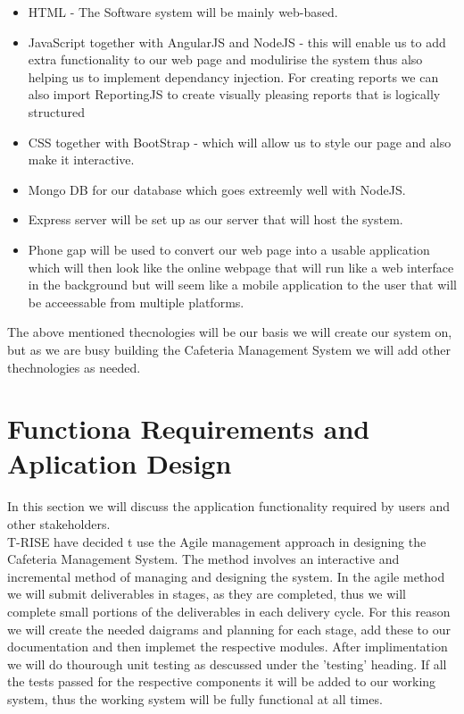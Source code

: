 \documentclass[12pt]{article}
\begin{document}
\begin{itemize}
  \item HTML - The Software system will be mainly web-based.

  \item JavaScript together with AngularJS  and NodeJS - this will enable us to add extra functionality to our web page and modulirise the system thus also helping us to implement dependancy injection. For creating reports we can also import ReportingJS to create visually pleasing reports that is logically structured

 \item CSS together with BootStrap - which will allow us to style our page and also make it interactive.

 \item Mongo DB for our database which goes extreemly well with NodeJS. 

 \item Express server will be set up as our server that will host the system.

 \item Phone gap will be used to convert our web page into a usable application which will then look like the online webpage that will run like a web interface in the background but  will seem like a mobile application to the user that will be acceessable from multiple platforms.

\end{itemize}
The above mentioned thecnologies will be our basis we will create our system on, but as we are busy building the Cafeteria Management System we will add other thechnologies as needed. 


\section{Functiona Requirements and Aplication Design}
In this section we will discuss the application functionality required by users and other stakeholders. \\
T-RISE have decided t use the Agile management approach in designing the Cafeteria Management System. The method involves an interactive and incremental method of managing and designing the system. In the agile method we will submit deliverables in stages, as they are completed, thus we will complete small portions of the deliverables in each delivery cycle. 
For this reason we will create the needed daigrams and planning for each stage, add these to our documentation and then implemet the respective modules. After implimentation we will do thourough unit testing as descussed under the 'testing' heading. If all the tests passed for the respective components it will be added to our working system, thus the working system will be fully functional at all times. 
\end{document}

